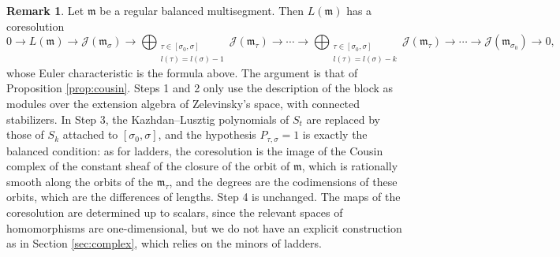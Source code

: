 \documentclass[a4paper,12pt,leqno]{amsart}
\newcommand{\frmm}{\mathfrak{m}}
\newcommand{\caJ}{\mathcal{J}}
\theoremstyle{plain}
\theoremstyle{definition}
\theoremstyle{definition}
\newtheorem{rmk}[thm]{Remark}
\begin{document}
\begin{rmk}\label{rmk:balanced} Let $\frmm$ be a regular balanced multisegment. Then $L(\frmm)$
has a coresolution
\[0\rightarrow L(\frmm)\rightarrow\caJ(\frmm_\sigma)\rightarrow\bigoplus_{\substack{\tau\in[\sigma_0,\sigma]\\
l(\tau)=l(\sigma)-1}}\caJ(\frmm_\tau)\rightarrow\cdots\rightarrow\bigoplus_{\substack{\tau\in[\sigma_0,\sigma]\\
l(\tau)=l(\sigma)-k}}\caJ(\frmm_\tau)\rightarrow\cdots\rightarrow\caJ(\frmm_{\sigma_0})\rightarrow0,\]
whose Euler characteristic is the formula above. The argument is that of Proposition
\ref{prop:cousin}. Steps 1 and 2 only use the description of the block as modules over the extension
algebra of Zelevinsky's space, with connected stabilizers. In Step 3, the Kazhdan--Lusztig
polynomials of $S_t$ are replaced by those of $S_k$ attached to $[\sigma_0,\sigma]$, and the
hypothesis $P_{\tau,\sigma}=1$ is exactly the balanced condition: as for ladders, the coresolution is
the image of the Cousin complex of the constant sheaf of the closure of the orbit of $\frmm$, which is
rationally smooth along the orbits of the $\frmm_\tau$, and the degrees are the codimensions of these
orbits, which are the differences of lengths. Step 4 is unchanged. The maps of the coresolution are
determined up to scalars, since the relevant spaces of homomorphisms are one-dimensional, but we do not
have an explicit construction as in Section \ref{sec:complex}, which relies on the minors of ladders.
\end{rmk}
\end{document}
